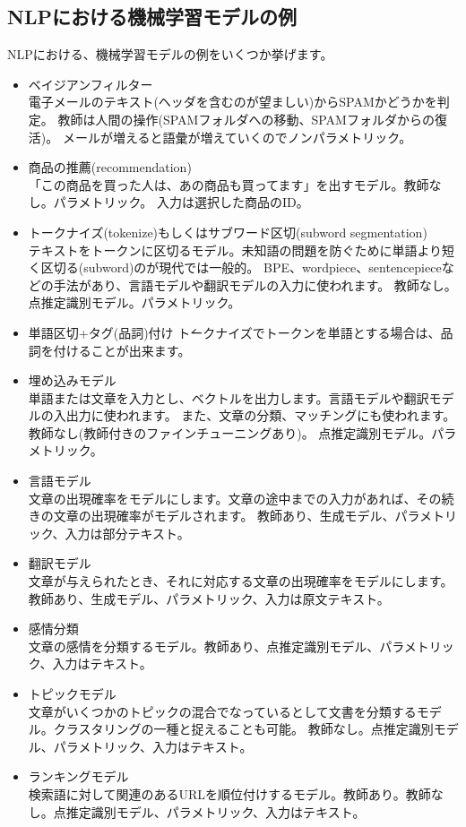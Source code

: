 \documentclass[a4j]{jarticle}
\begin{document}
\subsection{NLPにおける機械学習モデルの例}
NLPにおける、機械学習モデルの例をいくつか挙げます。
\begin{itemize}
\item ベイジアンフィルター \\
電子メールのテキスト(ヘッダを含むのが望ましい)からSPAMかどうかを判定。
教師は人間の操作(SPAMフォルダへの移動、SPAMフォルダからの復活)。
メールが増えると語彙が増えていくのでノンパラメトリック。
\item  商品の推薦(recommendation) \\
「この商品を買った人は、あの商品も買ってます」を出すモデル。教師なし。パラメトリック。
入力は選択した商品のID。
\item トークナイズ(tokenize)もしくはサブワード区切(subword segmentation) \\
テキストをトークンに区切るモデル。未知語の問題を防ぐために単語より短く区切る(subword)のが現代では一般的。
BPE、wordpiece、sentencepieceなどの手法があり、言語モデルや翻訳モデルの入力に使われます。
教師なし。点推定識別モデル。パラメトリック。
\item 単語区切+タグ(品詞)付け \'
トークナイズでトークンを単語とする場合は、品詞を付けることが出来ます。
\item 埋め込みモデル \\
単語または文章を入力とし、ベクトルを出力します。言語モデルや翻訳モデルの入出力に使われます。
また、文章の分類、マッチングにも使われます。教師なし(教師付きのファインチューニングあり)。
点推定識別モデル。パラメトリック。
\item 言語モデル \\
文章の出現確率をモデルにします。文章の途中までの入力があれば、その続きの文章の出現確率がモデルされます。
教師あり、生成モデル、パラメトリック、入力は部分テキスト。
\item 翻訳モデル \\
文章が与えられたとき、それに対応する文章の出現確率をモデルにします。
教師あり、生成モデル、パラメトリック、入力は原文テキスト。
\item 感情分類 \\
文章の感情を分類するモデル。教師あり、点推定識別モデル、パラメトリック、入力はテキスト。
\item トピックモデル \\
文章がいくつかのトピックの混合でなっているとして文書を分類するモデル。クラスタリングの一種と捉えることも可能。
教師なし。点推定識別モデル、パラメトリック、入力はテキスト。
\item ランキングモデル \\
検索語に対して関連のあるURLを順位付けするモデル。教師あり。教師なし。点推定識別モデル、パラメトリック、入力はテキスト。
\end{itemize}
\end{document}
